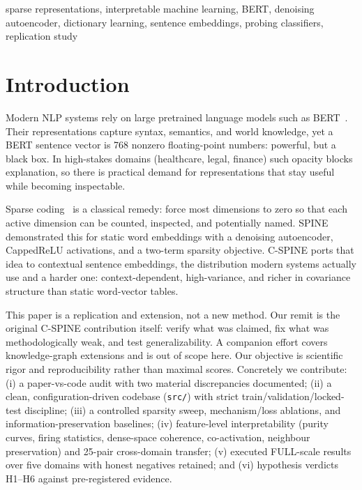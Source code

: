 \documentclass[conference]{IEEEtran}
\begin{document}
\begin{IEEEkeywords}
sparse representations, interpretable machine learning, BERT, denoising
autoencoder, dictionary learning, sentence embeddings, probing classifiers,
replication study
\end{IEEEkeywords}

\section{Introduction}
Modern NLP systems rely on large pretrained language models such as
BERT~\cite{devlin2019bert}. Their representations capture syntax, semantics,
and world knowledge, yet a BERT sentence vector is 768 nonzero
floating-point numbers: powerful, but a black box. In high-stakes domains
(healthcare, legal, finance) such opacity blocks explanation, so there is
practical demand for representations that stay useful while becoming
inspectable.

Sparse coding~\cite{olshausen1997sparse} is a classical remedy: force most
dimensions to zero so that each active dimension can be counted, inspected,
and potentially named. SPINE~\cite{subramanian2018spine} demonstrated this
for static word embeddings with a denoising autoencoder, CappedReLU
activations, and a two-term sparsity objective. C-SPINE ports that idea to
contextual sentence embeddings, the distribution modern systems actually
use and a harder one: context-dependent, high-variance, and richer in
covariance structure than static word-vector tables.

This paper is a replication and extension, not a new method. Our remit is
the original C-SPINE contribution itself: verify what was claimed, fix what
was methodologically weak, and test generalizability. A companion effort
covers knowledge-graph extensions and is out of scope here. Our objective is
scientific rigor and reproducibility rather than maximal scores. Concretely
we contribute: (i) a paper-vs-code audit with two material discrepancies
documented; (ii) a clean, configuration-driven codebase (\texttt{src/})
with strict train/validation/locked-test discipline; (iii) a controlled
sparsity sweep, mechanism/loss ablations, and information-preservation
baselines; (iv) feature-level interpretability (purity curves, firing
statistics, dense-space coherence, co-activation, neighbour preservation)
and 25-pair cross-domain transfer; (v) executed FULL-scale results over five
domains with honest negatives retained; and (vi) hypothesis verdicts H1--H6
against pre-registered evidence.
\end{document}
